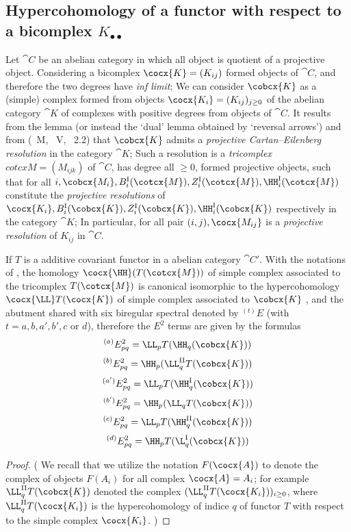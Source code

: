 \subsection{Hypercohomology of a functor with respect to a bicomplex $K_{\bullet\bullet}$}
\label{subsection:0.11.7}
\begin{env}[11.7.1]
Let $\cat{C}$ be an abelian category in which all object is quotient of a projective object.
Considering a bicomplex $\cocx{K} = (K_{ij})$ formed objects of $\cat{C}$, and therefore the two degrees have \emph{inf limit}; 
We can consider $\cobcx{K}$ as a (simple) complex formed from objects $\cocx{K_i} = (K_{ij})_{j\geq 0}$ of the abelian category $\cat{K}$ of complexes with positive degrees from objects of $\cat{C}$.
It results from the lemma  (or instead the `dual' lemma obtained by `reversal arrows') and from (~M, ~V, ~2.2) that $\cobcx{K}$ admits a \emph{projective Cartan--Eilenberg resolution} 
in the category $\cat{K}$; Such a resolution is a \emph{tricomplex} $cotcx{M} = (M_{ijk})$ of $\cat{C}$, has degree all $\geq 0$, formed projective objects, such that 
for all $i,\cobcx{M_i}, B_i^\text{I}(\cotcx{M}), Z_i^\text{I}(\cotcx{M}), \HH_i^\text{I}(\cotcx{M})$ constitute the \emph{projective resolutions} of 
$\cocx{K_i}, B_i^\text{I}(\cobcx{K}), Z_i^\text{I}(\cobcx{K}), \HH_i^\text{I}(\cobcx{K})$ respectively in the category $\cat{K}$; 
In particular, for all pair $(i,j), \cocx{M_{ij}}$ is a \emph{projective resolution} of $K_{ij}$ in $\cat{C}$.
\end{env}

\begin{proposition}[11.7.2]
If $T$ is a additive covariant functor in a abelian category $\cat{C'}$. 
With the notations of , the homology $\cocx{\HH}(T(\cotcx{M}))$ of simple complex associated to the tricomplex $T(\cotcx{M})$ is canonical isomorphic to 
the hypercohomology $\cocx{\LL} T(\cocx{K})$ of simple complex associated to $\cobcx{K}$ , and the abutment shared with six biregular spectral denoted by 
$^{(t)}E$ (with $t=a,b,a',b',c$ or $d$), therefore the $E^2$ terms are given by the formulas 
\[
  ^{(a)}E_{pq}^2 = \LL_p T(\HH_q(\cobcx{K}))
\]
\[
  ^{(b)}E_{pq}^2 = \HH_p (\LL_q^\text{II}T(\cobcx{K}))
\]
\[
  ^{(a')}E_{pq}^2 = \LL_p T(\HH_q^\text{I}(\cobcx{K}))
\]
\[
  ^{(b')}E_{pq}^2 = \HH_p (\LL_q T(\cobcx{K}))
\]
\[
  ^{(c)}E_{pq}^2 = \LL_p T(\HH_q^\text{II}(\cobcx{K}))
\]
\[
  ^{(d)}E_{pq}^2 = \HH_p T(\L_q^\text{I}(\cobcx{K}))
\]
\end{proposition}
\begin{proof}
(
  We recall that we utilize the notation $F(\cocx{A})$ to denote the complex of objects $F(A_i)$ for all complex $\cocx{A} = A_i$; 
  for example $\LL_q^\text{II} T(\cobcx{K})$ denoted the complex $(\LL_q^\text{II} T(\cocx{K_i}))_{i\geq 0}$, 
  where $\LL_q^\text{II} T(\cocx{K_i})$ is the hypercohomology of indice $q$ of functor $T$ with respect to the simple complex $\cocx{K_i}$.
)
\end{proof}

